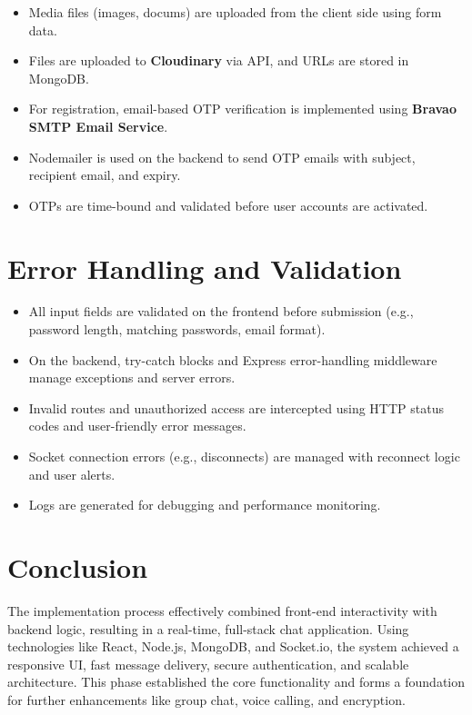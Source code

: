 \documentclass[12pt,a4paper]{report}
\begin{document}
\begin{itemize}
    \item Media files (images, docums) are uploaded from the client side using form data.
    \item Files are uploaded to \textbf{Cloudinary} via API, and URLs are stored in MongoDB.
    \item For registration, email-based OTP verification is implemented using \textbf{Bravao SMTP Email Service}.
    \item Nodemailer is used on the backend to send OTP emails with subject, recipient email, and expiry.
    \item OTPs are time-bound and validated before user accounts are activated.
\end{itemize}

\section{Error Handling and Validation}
\begin{itemize}
    \item All input fields are validated on the frontend before submission (e.g., password length, matching passwords, email format).
    \item On the backend, try-catch blocks and Express error-handling middleware manage exceptions and server errors.
    \item Invalid routes and unauthorized access are intercepted using HTTP status codes and user-friendly error messages.
    \item Socket connection errors (e.g., disconnects) are managed with reconnect logic and user alerts.
    \item Logs are generated for debugging and performance monitoring.
\end{itemize}

\section{Conclusion}
The implementation process effectively combined front-end interactivity with backend logic, resulting in a real-time, full-stack chat application. Using technologies like React, Node.js, MongoDB, and Socket.io, the system achieved a responsive UI, fast message delivery, secure authentication, and scalable architecture. This phase established the core functionality and forms a foundation for further enhancements like group chat, voice calling, and encryption.
\end{document}
